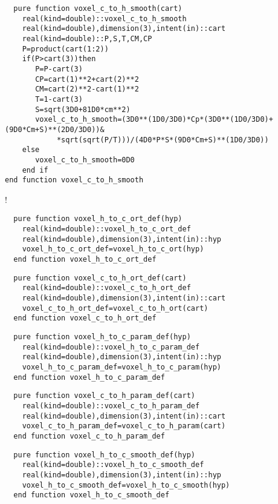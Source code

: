 \begin{Verbatim}
  pure function voxel_c_to_h_smooth(cart)
    real(kind=double)::voxel_c_to_h_smooth
    real(kind=double),dimension(3),intent(in)::cart
    real(kind=double)::P,S,T,CM,CP
    P=product(cart(1:2))
    if(P>cart(3))then
       P=P-cart(3)
       CP=cart(1)**2+cart(2)**2
       CM=cart(2)**2-cart(1)**2
       T=1-cart(3)
       S=sqrt(3D0+81D0*cm**2)
       voxel_c_to_h_smooth=(3D0**(1D0/3D0)*Cp*(3D0**(1D0/3D0)+(9D0*Cm+S)**(2D0/3D0))&
            *sqrt(sqrt(P/T)))/(4D0*P*S*(9D0*Cm+S)**(1D0/3D0))
    else
       voxel_c_to_h_smooth=0D0
    end if
end function voxel_c_to_h_smooth
\end{Verbatim}

!

\begin{Verbatim}
  pure function voxel_h_to_c_ort_def(hyp)
    real(kind=double)::voxel_h_to_c_ort_def
    real(kind=double),dimension(3),intent(in)::hyp
    voxel_h_to_c_ort_def=voxel_h_to_c_ort(hyp)
  end function voxel_h_to_c_ort_def
\end{Verbatim}

\begin{Verbatim}
  pure function voxel_c_to_h_ort_def(cart)
    real(kind=double)::voxel_c_to_h_ort_def
    real(kind=double),dimension(3),intent(in)::cart
    voxel_c_to_h_ort_def=voxel_c_to_h_ort(cart)
  end function voxel_c_to_h_ort_def
\end{Verbatim}

\begin{Verbatim}
  pure function voxel_h_to_c_param_def(hyp)
    real(kind=double)::voxel_h_to_c_param_def
    real(kind=double),dimension(3),intent(in)::hyp
    voxel_h_to_c_param_def=voxel_h_to_c_param(hyp)
  end function voxel_h_to_c_param_def
\end{Verbatim}

\begin{Verbatim}
  pure function voxel_c_to_h_param_def(cart)
    real(kind=double)::voxel_c_to_h_param_def
    real(kind=double),dimension(3),intent(in)::cart
    voxel_c_to_h_param_def=voxel_c_to_h_param(cart)
  end function voxel_c_to_h_param_def
\end{Verbatim}

\begin{Verbatim}
  pure function voxel_h_to_c_smooth_def(hyp)
    real(kind=double)::voxel_h_to_c_smooth_def
    real(kind=double),dimension(3),intent(in)::hyp
    voxel_h_to_c_smooth_def=voxel_h_to_c_smooth(hyp)
  end function voxel_h_to_c_smooth_def
\end{Verbatim}

